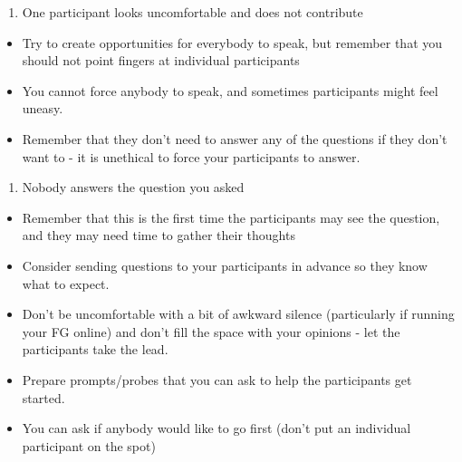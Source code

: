 \documentclass[
  english,
  letterpaper,
  DIV=11,
  numbers=noendperiod]{scrreprt}
\providecommand{\tightlist}{%
  \setlength{\itemsep}{0pt}\setlength{\parskip}{0pt}}
\begin{document}
\begin{enumerate}
\def\labelenumi{\arabic{enumi}.}
\setcounter{enumi}{4}
\tightlist
\item
  One participant looks uncomfortable and does not contribute
\end{enumerate}

\begin{tcolorbox}[enhanced jigsaw, breakable, bottomtitle=1mm, leftrule=.75mm, opacityback=0, colbacktitle=quarto-callout-caution-color!10!white, opacitybacktitle=0.6, toprule=.15mm, colback=white, left=2mm, coltitle=black, bottomrule=.15mm, titlerule=0mm, title={Suggested Solutions}, toptitle=1mm, colframe=quarto-callout-caution-color-frame, arc=.35mm, rightrule=.15mm]

\begin{itemize}
\tightlist
\item
  Try to create opportunities for everybody to speak, but remember that
  you should not point fingers at individual participants
\item
  You cannot force anybody to speak, and sometimes participants might
  feel uneasy.
\item
  Remember that they don't need to answer any of the questions if they
  don't want to - it is unethical to force your participants to answer.
\end{itemize}

\end{tcolorbox}

\begin{enumerate}
\def\labelenumi{\arabic{enumi}.}
\setcounter{enumi}{5}
\tightlist
\item
  Nobody answers the question you asked
\end{enumerate}

\begin{tcolorbox}[enhanced jigsaw, breakable, bottomtitle=1mm, leftrule=.75mm, opacityback=0, colbacktitle=quarto-callout-caution-color!10!white, opacitybacktitle=0.6, toprule=.15mm, colback=white, left=2mm, coltitle=black, bottomrule=.15mm, titlerule=0mm, title={Suggested Solutions}, toptitle=1mm, colframe=quarto-callout-caution-color-frame, arc=.35mm, rightrule=.15mm]

\begin{itemize}
\tightlist
\item
  Remember that this is the first time the participants may see the
  question, and they may need time to gather their thoughts
\item
  Consider sending questions to your participants in advance so they
  know what to expect.
\item
  Don't be uncomfortable with a bit of awkward silence (particularly if
  running your FG online) and don't fill the space with your opinions -
  let the participants take the lead.
\item
  Prepare prompts/probes that you can ask to help the participants get
  started.
\item
  You can ask if anybody would like to go first (don't put an individual
  participant on the spot)
\end{itemize}

\end{tcolorbox}
\end{document}
